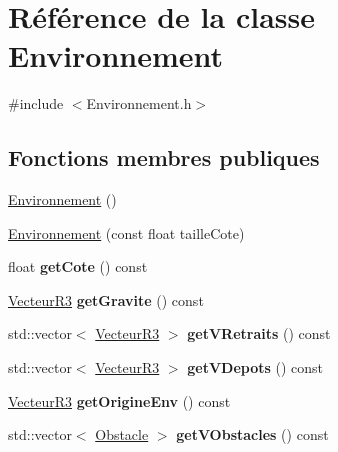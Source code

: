 \hypertarget{class_environnement}{}\section{Référence de la classe Environnement}
\label{class_environnement}


{\ttfamily \#include $<$Environnement.\+h$>$}

\subsection*{Fonctions membres publiques}
\begin{DoxyCompactItemize}
\item 
\mbox{\hyperlink{class_environnement_aebf8b1591072ad4585fec2db39942f60}{Environnement}} ()
\item 
\mbox{\hyperlink{class_environnement_a47869a858cb9d9ef3fdae28410646691}{Environnement}} (const float taille\+Cote)
\item 
\mbox{\label{class_environnement_a465db1cf8ff840aa6d187a489225917b}} 
float {\bfseries get\+Cote} () const
\item 
\mbox{\label{class_environnement_a9b81243bb194b219d0707480cc888144}} 
\mbox{\hyperlink{class_vecteur_r3}{Vecteur\+R3}} {\bfseries get\+Gravite} () const
\item 
\mbox{\label{class_environnement_a4fced4e05ce0563a6e14f366b7ebe9ba}} 
std\+::vector$<$ \mbox{\hyperlink{class_vecteur_r3}{Vecteur\+R3}} $>$ {\bfseries get\+V\+Retraits} () const
\item 
\mbox{\label{class_environnement_ac9342b4f11be3856f129cb38590b43de}} 
std\+::vector$<$ \mbox{\hyperlink{class_vecteur_r3}{Vecteur\+R3}} $>$ {\bfseries get\+V\+Depots} () const
\item 
\mbox{\label{class_environnement_aafb362bf7270314f8032e49f23ec3de2}} 
\mbox{\hyperlink{class_vecteur_r3}{Vecteur\+R3}} {\bfseries get\+Origine\+Env} () const
\item 
\mbox{\label{class_environnement_add48798bc7467e112020e8c0cf7f57ed}} 
std\+::vector$<$ \mbox{\hyperlink{class_obstacle}{Obstacle}} $>$ {\bfseries get\+V\+Obstacles} () const

\end{DoxyCompactItemize}
